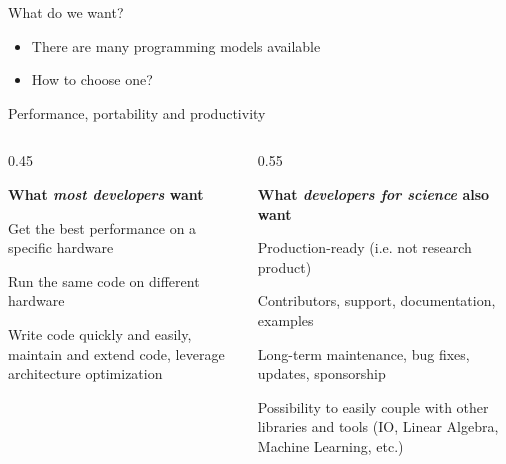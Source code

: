 \documentclass[
    aspectratio=169,
]{beamer}
\begin{document}
\begin{frame}{What do we want?}
    \begin{itemize}
        \item There are many programming models available
        \item How to choose one?
    \end{itemize}
\end{frame}

\begin{frame}{Performance, portability and productivity}
    \begin{columns}[T]
        \begin{column}{0.45\linewidth}
            \begin{center}
            \textbf{What \emph{most developers} want}
            \end{center}
            \begin{description}[Performance]
                \item[Performance] Get the best performance on a specific hardware
                \item[Portability] Run the same code on different hardware
                \item[Productivity] Write code quickly and easily, maintain and extend code, leverage architecture optimization
            \end{description}
        \end{column}
        \pause
        \begin{column}{0.55\linewidth}
            \begin{center}
                \textbf{What \emph{developers for science} also want}
            \end{center}
            \begin{description}[Interporability]
                \item[Maturity] Production-ready (i.e. not research product)
                \item[Community] Contributors, support, documentation, examples
                \item[Longevity] Long-term maintenance, bug fixes, updates, sponsorship
                \item[Interporability] Possibility to easily couple with other libraries and tools (IO, Linear Algebra, Machine Learning, etc.)
            \end{description}
        \end{column}
    \end{columns}
\end{frame}
\end{document}
